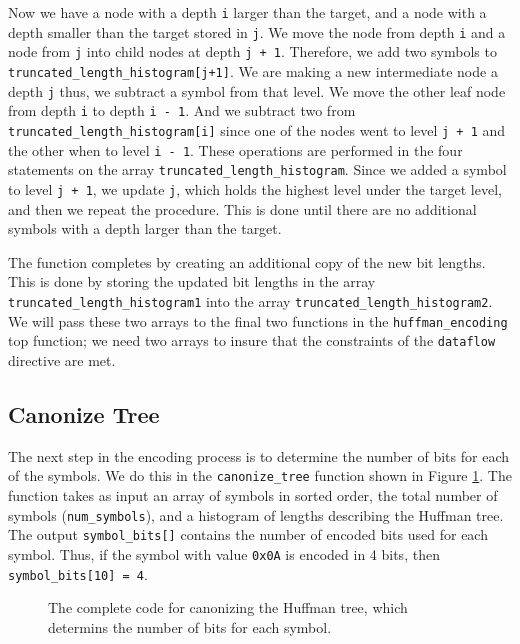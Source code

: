 Now we have a node with a depth \lstinline{i} larger than the target, and a node with a depth smaller than the target stored in \lstinline{j}. We move the node from depth \lstinline{i} and a node from \lstinline{j} into child nodes at depth \lstinline{j + 1}. Therefore, we add two symbols to \lstinline{truncated_length_histogram[j+1]}. We are making a new intermediate node a depth \lstinline{j} thus, we subtract a symbol from that level. We move the other leaf node from depth \lstinline{i} to depth \lstinline{i - 1}. And we subtract two from \lstinline{truncated_length_histogram[i]} since one of the nodes went to level \lstinline{j + 1} and the other when to level \lstinline{i - 1}. These operations are performed in the four statements on the array \lstinline{truncated_length_histogram}. Since we added a symbol to level \lstinline{j + 1}, we update \lstinline{j}, which holds the highest level under the target level, and then we repeat the procedure. This is done until there are no additional symbols with a depth larger than the target.

The function completes by creating an additional copy of the new bit lengths. This is done by storing the updated bit lengths in the array \lstinline{truncated_length_histogram1} into the array \lstinline{truncated_length_histogram2}. We will pass these two arrays to the final two functions in the \lstinline{huffman_encoding} top function; we need two arrays to insure that the constraints of the \lstinline{dataflow} directive are met.

\subsection{Canonize Tree}
\label{sec:huffman_canonize_tree}

The next step in the encoding process is to determine the number of bits for each of the symbols. We do this in the \lstinline{canonize_tree} function shown in Figure \ref{fig:huffman_canonize_tree.cpp}. The function takes as input an array of symbols in sorted order, the total number of symbols (\lstinline{num_symbols}), and a histogram of lengths describing the Huffman tree. The output \lstinline{symbol_bits[]} contains the number of encoded bits used for each symbol. Thus, if the symbol with value \lstinline{0x0A} is encoded in 4 bits, then \lstinline{symbol_bits[10] = 4}. 

\begin{figure}
{\tiny }
\caption{ The complete code for canonizing the Huffman tree, which determins the number of bits for each symbol. }
\label{fig:huffman_canonize_tree.cpp}
\end{figure}

